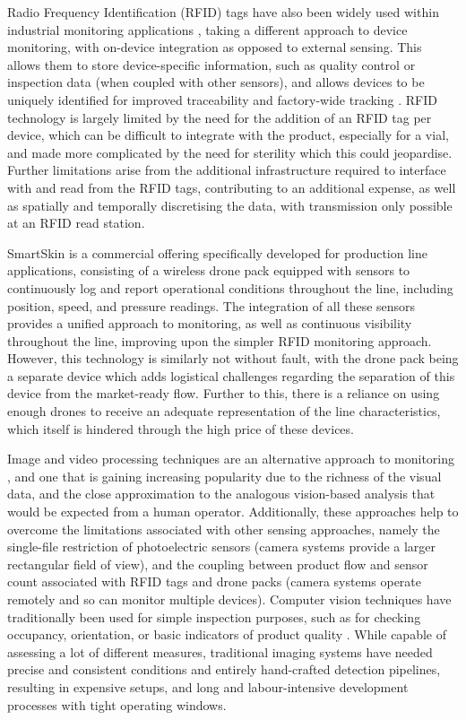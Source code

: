 \documentclass[10pt]{article}
\begin{document}
Radio Frequency Identification (RFID) tags have also been widely used within industrial monitoring applications \cite{rfid}, taking a different approach to device monitoring, with on-device integration as opposed to external sensing. This allows them to store device-specific information, such as quality control or inspection data (when coupled with other sensors), and allows devices to be uniquely identified for improved traceability and factory-wide tracking \cite{brusey2009effective}. RFID technology is largely limited by the need for the addition of an RFID tag per device, which can be difficult to integrate with the product, especially for a vial, and made more complicated by the need for sterility which this could jeopardise. Further limitations arise from the additional infrastructure required to interface with and read from the RFID tags, contributing to an additional expense, as well as spatially and temporally discretising the data, with transmission only possible at an RFID read station.

SmartSkin \cite{smartskin} is a commercial offering specifically developed for production line applications, consisting of a wireless drone pack equipped with sensors to continuously log and report operational conditions throughout the line, including position, speed, and pressure readings. The integration of all these sensors provides a unified approach to monitoring, as well as continuous visibility throughout the line, improving upon the simpler RFID monitoring approach. However, this technology is similarly not without fault, with the drone pack being a separate device which adds logistical challenges regarding the separation of this device from the market-ready flow. Further to this, there is a reliance on using enough drones to receive an adequate representation of the line characteristics, which itself is hindered through the high price of these devices.

Image and video processing techniques are an alternative approach to monitoring \cite{radu2014image}, and one that is gaining increasing popularity due to the richness of the visual data, and the close approximation to the analogous vision-based analysis that would be expected from a human operator. Additionally, these approaches help to overcome the limitations associated with other sensing approaches, namely the single-file restriction of photoelectric sensors (camera systems provide a larger rectangular field of view), and the coupling between product flow and sensor count associated with RFID tags and drone packs (camera systems operate remotely and so can monitor multiple devices). Computer vision techniques have traditionally been used for simple inspection purposes, such as for checking occupancy, orientation, or basic indicators of product quality \cite{cabral2015intelligent}. While capable of assessing a lot of different measures, traditional imaging systems have needed precise and consistent conditions and entirely hand-crafted detection pipelines, resulting in expensive setups, and long and labour-intensive development processes with tight operating windows.
\end{document}
